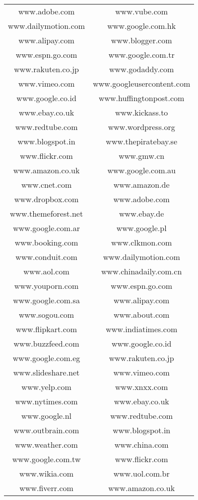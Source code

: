 \begin{longtable}{c c}
www.adobe.com & www.vube.com \\
www.dailymotion.com & www.google.com.hk \\
www.alipay.com & www.blogger.com \\
www.espn.go.com & www.google.com.tr \\
www.rakuten.co.jp & www.godaddy.com \\
www.vimeo.com & www.googleusercontent.com \\
www.google.co.id & www.huffingtonpost.com \\
www.ebay.co.uk & www.kickass.to \\
www.redtube.com & www.wordpress.org \\
www.blogspot.in & www.thepiratebay.se \\
www.flickr.com & www.gmw.cn \\
www.amazon.co.uk & www.google.com.au \\
www.cnet.com & www.amazon.de \\
www.dropbox.com & www.adobe.com \\
www.themeforest.net & www.ebay.de \\
www.google.com.ar & www.google.pl \\
www.booking.com & www.clkmon.com \\
www.conduit.com & www.dailymotion.com \\
www.aol.com & www.chinadaily.com.cn \\
www.youporn.com & www.espn.go.com \\
www.google.com.sa & www.alipay.com \\
www.sogou.com & www.about.com \\
www.flipkart.com & www.indiatimes.com \\
www.buzzfeed.com & www.google.co.id \\
www.google.com.eg & www.rakuten.co.jp \\
www.slideshare.net & www.vimeo.com \\
www.yelp.com & www.xnxx.com \\
www.nytimes.com & www.ebay.co.uk \\
www.google.nl & www.redtube.com \\
www.outbrain.com & www.blogspot.in \\
www.weather.com & www.china.com \\
www.google.com.tw & www.flickr.com \\
www.wikia.com & www.uol.com.br \\
www.fiverr.com & www.amazon.co.uk \\

\end{longtable}
